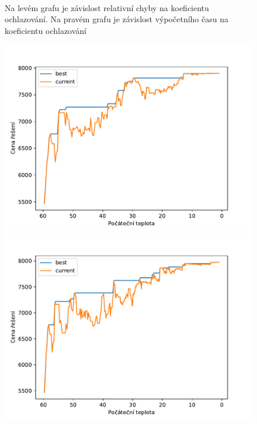 \documentclass[11pt]{article}
\begin{document}
\begin{figure}
\begin{minipage}[c]{0.49\textwidth}
    \end{minipage}
    \\
   \caption{Na levém grafu je závislost relativní chyby na koeficientu ochlazování. Na pravém grafu je závislost výpočetního času na koeficientu ochlazování}\label{fig:GVI}
\end{figure} 

\begin{figure}
	\centering
    \begin{minipage}[c]{0.49\textwidth}
        \centering\includegraphics[width=\textwidth]{img/993.pdf} 
    \end{minipage}
    \begin{minipage}[c]{0.48\textwidth}
        \centering \includegraphics[width=\textwidth]{img/995.pdf} 

\end{minipage}
\end{figure}
\end{document}
